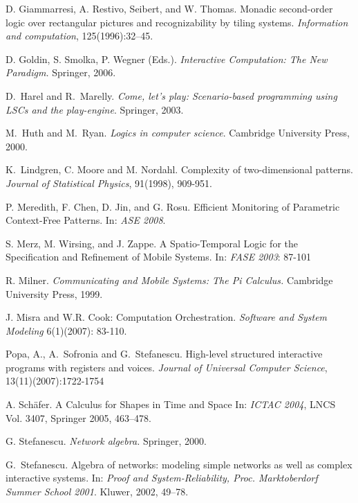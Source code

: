 \documentclass[runningheads]{llncs}
\newcommand{\1}{\u{a}}
\newcommand{\2}{\c{s}}
\newcommand{\5}{\c{t}}
\newcommand{\8}{\^{\i}}
\newcommand{\9}{\^{a}}
\def\newblock{}
\def\newblock{}
\begin{document}
\begin{thebibliography}{99}
D. Giammarresi, A. Restivo, Seibert, and W. Thomas. 
\newblock Monadic second-order logic over rectangular pictures and recognizability by tiling systems.
\newblock {\em Information and computation}, 125(1996):32--45.
 
D. Goldin, S. Smolka, P. Wegner (Eds.).
\newblock {\em Interactive Computation: The New Paradigm.}
\newblock Springer, 2006.

D.~Harel and R.~Marelly.
\newblock {\it Come, let's play: Scenario-based programming using LSCs and the play-engine}.
\newblock Springer, 2003.

M.~Huth and M.~Ryan.
\newblock {\it Logics in computer science}.
\newblock Cambridge University Press, 2000.

K.~Lindgren, C. Moore and M. Nordahl. 
\newblock Complexity of two-dimensional patterns.
\newblock {\it Journal of Statistical Physics}, 91(1998), 909-951. 

P. Meredith, F. Chen, D. Jin, and G. Rosu.
\newblock Efficient Monitoring of Parametric Context-Free Patterns. 
\newblock In: {\it ASE 2008}.

S. Merz, M. Wirsing, and J. Zappe.
\newblock A Spatio-Temporal Logic for the Specification and Refinement of Mobile Systems. 
\newblock In: {\it FASE 2003}: 87-101 

R. Milner.
\newblock {\em Communicating and Mobile Systems: The Pi Calculus.}
\newblock Cambridge University Press, 1999.

J. Misra and W.R. Cook: 
\newblock Computation Orchestration. 
\newblock {\em Software and System Modeling} 6(1)(2007): 83-110.

Popa, A., A.~Sofronia and G.~Stefanescu.
\newblock High-level structured interactive programs with registers and voices.
\newblock {\it Journal of Universal Computer Science}, 13(11)(2007):1722-1754

A. Sch\"afer.
\newblock A Calculus for Shapes in Time and Space
\newblock In: {\em ICTAC 2004}, LNCS Vol. 3407, Springer 2005, 463--478.

G. Stefanescu.  
\newblock {\em Network algebra.}
\newblock Springer, 2000.

G.~Stefanescu. 
\newblock Algebra of networks: modeling simple networks as well as complex interactive systems.
\newblock In: {\it Proof and System-Reliability, Proc. Marktoberdorf Summer School 2001}.
\newblock Kluwer, 2002, 49--78.


\end{thebibliography}
\end{document}
